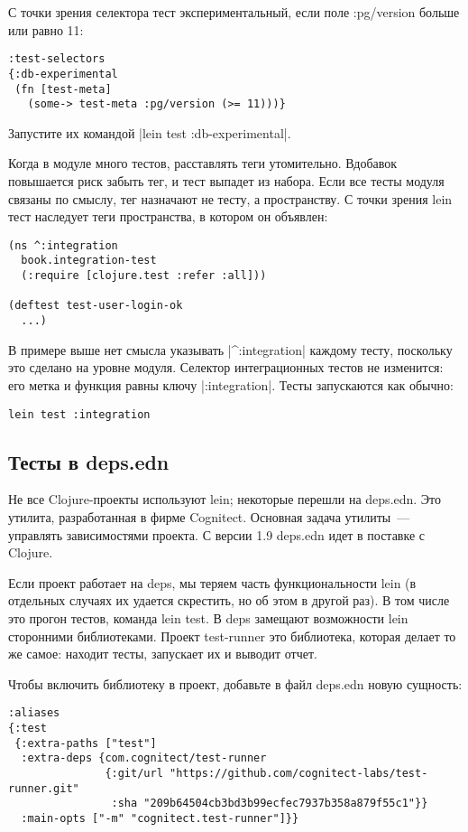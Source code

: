 С точки зрения селектора тест экспериментальный, если поле :pg/version больше
или равно 11:

\begin{verbatim}
:test-selectors
{:db-experimental
 (fn [test-meta]
   (some-> test-meta :pg/version (>= 11)))}
\end{verbatim}

Запустите их командой \spverb|lein test :db-experimental|.

Когда в модуле много тестов, расставлять теги утомительно. Вдобавок повышается
риск забыть тег, и тест выпадет из набора. Если все тесты модуля связаны по
смыслу, тег назначают не тесту, а пространству. С точки зрения lein тест
наследует теги пространства, в котором он объявлен:

\begin{verbatim}
(ns ^:integration
  book.integration-test
  (:require [clojure.test :refer :all]))

(deftest test-user-login-ok
  ...)
\end{verbatim}

В примере выше нет смысла указывать \spverb|^:integration| каждому тесту,
поскольку это сделано на уровне модуля. Селектор интеграционных тестов не
изменится: его метка и функция равны ключу \spverb|:integration|. Тесты
запускаются как обычно:

\begin{verbatim}
lein test :integration
\end{verbatim}

\subsection{Тесты в deps.edn}

Не все Clojure-проекты используют lein; некоторые перешли на deps.edn. Это
утилита, разработанная в фирме Cognitect. Основная задача утилиты~--- управлять
зависимостями проекта. С версии 1.9 deps.edn идет в поставке с Clojure.

Если проект работает на deps, мы теряем часть функциональности lein (в отдельных
случаях их удается скрестить, но об этом в другой раз). В том числе это прогон
тестов, команда lein test. В deps замещают возможности lein сторонними
библиотеками. Проект test-runner это библиотека, которая делает то же самое:
находит тесты, запускает их и выводит отчет.

Чтобы включить библиотеку в проект, добавьте в файл deps.edn новую сущность:

\begin{verbatim}
:aliases
{:test
 {:extra-paths ["test"]
  :extra-deps {com.cognitect/test-runner
               {:git/url "https://github.com/cognitect-labs/test-runner.git"
                :sha "209b64504cb3bd3b99ecfec7937b358a879f55c1"}}
  :main-opts ["-m" "cognitect.test-runner"]}}
\end{verbatim}

